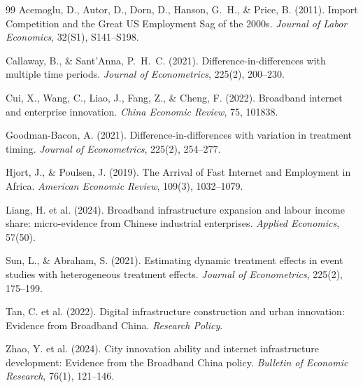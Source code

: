 \documentclass[12pt, a4paper]{article}
\begin{document}
\newpage
\begin{thebibliography}{99}
Acemoglu, D., Autor, D., Dorn, D., Hanson, G.~H., \& Price, B. (2011).
Import Competition and the Great US Employment Sag of the 2000s.
\textit{Journal of Labor Economics}, 32(S1), S141--S198.

Callaway, B., \& Sant'Anna, P.~H.~C. (2021).
Difference-in-differences with multiple time periods.
\textit{Journal of Econometrics}, 225(2), 200--230.

Cui, X., Wang, C., Liao, J., Fang, Z., \& Cheng, F. (2022).
Broadband internet and enterprise innovation.
\textit{China Economic Review}, 75, 101838.

Goodman-Bacon, A. (2021).
Difference-in-differences with variation in treatment timing.
\textit{Journal of Econometrics}, 225(2), 254--277.

Hjort, J., \& Poulsen, J. (2019).
The Arrival of Fast Internet and Employment in Africa.
\textit{American Economic Review}, 109(3), 1032--1079.

Liang, H. et al. (2024).
Broadband infrastructure expansion and labour income share:
micro-evidence from Chinese industrial enterprises.
\textit{Applied Economics}, 57(50).

Sun, L., \& Abraham, S. (2021).
Estimating dynamic treatment effects in event studies with
heterogeneous treatment effects.
\textit{Journal of Econometrics}, 225(2), 175--199.

Tan, C. et al. (2022).
Digital infrastructure construction and urban innovation:
Evidence from Broadband China.
\textit{Research Policy}.

Zhao, Y. et al. (2024).
City innovation ability and internet infrastructure development:
Evidence from the Broadband China policy.
\textit{Bulletin of Economic Research}, 76(1), 121--146.
\end{thebibliography}
\end{document}
